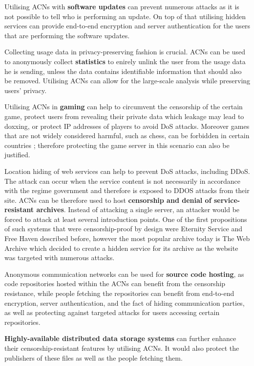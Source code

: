 Utilising ACNs with \textbf{software updates} can prevent numerous attacks as it is not possible to tell who is performing an update. On top of that utilising hidden services can provide end-to-end encryption and server authentication for the users that are performing the software updates.

Collecting usage data in privacy-preserving fashion is crucial. ACNs can be used to anonymously collect \textbf{statistics} to enirely unlink the user from the usage data he is sending, unless the data contains identifiable information that should also be removed. Utilising ACNs can allow for the large-scale analysis while preserving users' privacy.

Utilising ACNs in \textbf{gaming} can help to circumvent the censorship of the certain game, protect users from revealing their private data which leakage may lead to doxxing, or protect IP addresses of players to avoid DoS attacks. Moreover games that are not widely considered harmful, such as chess, can be forbidden in certain countries \cite{afghanistan-chess}; therefore protecting the game server in this scenario can also be justified.

Location hiding of web services can help to prevent DoS attacks, including DDoS. The attack can occur when the service content is not necessarily in accordance with the regime government and therefore is exposed to DDOS attacks from their site. ACNs can be therefore used to host \textbf{censorship and denial of service-resistant archives}. Instead of attacking a single server, an attacker would be forced to attack at least several introduction points. One of the first propositions of such systems that were censorship-proof by design were Eternity Service and Free Haven described before, however the most popular archive today is The Web Archive which decided to create a hidden service for its archive as the website was targeted with numerous attacks.

Anonymous communication networks can be used for \textbf{source code hosting}, as code repositories hosted within the ACNs can benefit from the censorship resistance, while people fetching the repositories can benefit from end-to-end encryption, server authentication, and the fact of hiding communication parties, as well as protecting against targeted attacks for users accessing certain repositories.

\textbf{Highly-available distributed data storage systems} can further enhance their censorship-resistant features by utilising ACNs. It would also protect the publishers of these files as well as the people fetching them.

